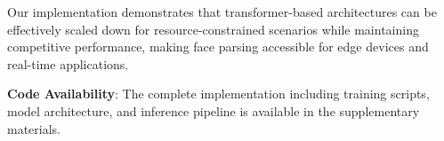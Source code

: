 Our implementation demonstrates that transformer-based architectures can be effectively scaled down for resource-constrained scenarios while maintaining competitive performance, making face parsing accessible for edge devices and real-time applications.

\textbf{Code Availability}: The complete implementation including training scripts, model architecture, and inference pipeline is available in the supplementary materials.
